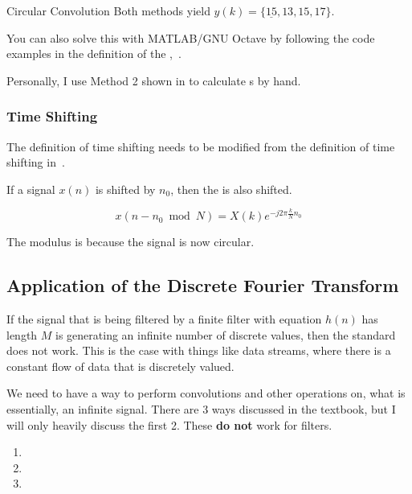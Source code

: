 \begin{example}{Circular Convolution}
  Both methods yield $y(k) = \lbrace \underline{15}, 13, 15, 17 \rbrace$.

  \begin{remark*}
    You can also solve this with MATLAB/GNU Octave by following the code examples in the definition of the ,~.
  \end{remark*}
\end{example}

\begin{remark*}
  Personally, I use Method 2 shown in  to calculate s by hand.
\end{remark*}

\subsubsection{Time Shifting}\label{subsubsec:DFT_Properties-Time_Shifting}
The definition of time shifting needs to be modified from the definition of time shifting in~.

\begin{definition}\label{def:DFT_Properties-Time_Shifting}
  If a signal $x(n)$ is shifted by $n_{0}$, then the  is also shifted.

  \begin{equation}\label{eq:DFT_Properties-Time_Shifting}
    x(n - n_{0} \bmod N) = X(k) e^{-j 2\pi \frac{k}{N} n_{0}}
  \end{equation}

  The modulus is because the signal is now circular.
\end{definition}

\subsection{Application of the Discrete Fourier Transform}\label{subsec:DFT_Application}
If the signal that is being filtered by a finite filter with equation $h(n)$ has length $M$ is generating an infinite number of discrete values, then the standard  does not work.
This is the case with things like data streams, where there is a constant flow of data that is discretely valued.

We need to have a way to perform convolutions and other operations on, what is essentially, an infinite signal.
There are 3 ways discussed in the textbook, but I will only heavily discuss the first 2.
These \textbf{do not} work for  filters.
\begin{enumerate}[noitemsep]
\item {}
\item {}
\item {}
\end{enumerate}

